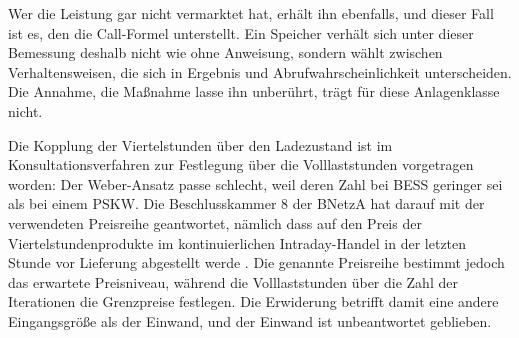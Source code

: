 Wer die Leistung gar nicht vermarktet hat, erhält ihn ebenfalls, und dieser Fall ist es, den die Call-Formel unterstellt. Ein Speicher verhält sich unter dieser Bemessung deshalb nicht wie ohne Anweisung, sondern wählt zwischen Verhaltensweisen, die sich in Ergebnis und Abrufwahrscheinlichkeit unterscheiden. Die Annahme, die Maßnahme lasse ihn unberührt, trägt für diese Anlagenklasse nicht.

Die Kopplung der Viertelstunden über den Ladezustand ist im Konsultationsverfahren zur Festlegung über die Volllaststunden vorgetragen worden: Der Weber-Ansatz passe schlecht, weil deren Zahl bei \ac{BESS} geringer sei als bei einem \ac{PSKW}.
Die Beschlusskammer 8 der \ac{BNetzA} hat darauf mit der verwendeten Preisreihe geantwortet, nämlich dass auf den Preis der Viertelstundenprodukte im kontinuierlichen Intraday-Handel in der letzten Stunde vor Lieferung abgestellt werde \cite{bundesnetzagentur_anlage1_2024}.
Die genannte Preisreihe bestimmt jedoch das erwartete Preisniveau, während die Volllaststunden über die Zahl der Iterationen die Grenzpreise festlegen.
Die Erwiderung betrifft damit eine andere Eingangsgröße als der Einwand, und der Einwand ist unbeantwortet geblieben.